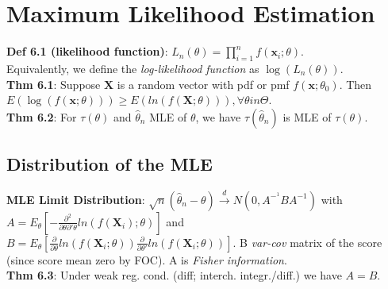 \section{Maximum Likelihood Estimation}
\textbf{Def 6.1 (likelihood function)}: $L_n(\theta) = \prod_{i=1}^nf(\textbf{x}_i;\theta)$.\\
Equivalently, we define the \textit{log-likelihood function} as $\log(L_n(\theta))$.\\
\textbf{Thm 6.1}: Suppose $\textbf{X}$ is a random vector with pdf or pmf $f(\textbf{x};\theta_0)$. Then $E(\log(f(\textbf{x};\theta)))\geq E(ln(f(\textbf{X};\theta))), \forall \theta in \Theta$.\\
\textbf{Thm 6.2}: For $\tau(\theta)$ and $\hat{\theta}_n$ MLE of $\theta$, we have $\tau(\hat{\theta}_n)$ is MLE of $\tau(\theta)$.

\subsection{Distribution of the MLE}
\textbf{MLE Limit Distribution}: $\sqrt{n}(\hat{\theta}_n - \theta) \xrightarrow{d} N(0, A^{-^1}BA^{-1})$ with $A = E_\theta[-\frac{\partial^2}{\partial\theta\partial'\theta}ln(f(\textbf{X}_i);\theta)]$ and $B = E_\theta[\frac{\partial}{\partial\theta}ln(f(\textbf{X}_i;\theta))\frac{\partial}{\partial\theta'}ln(f(\textbf{X}_i;\theta))]$. B \textit{var-cov} matrix of the score (since score mean zero by FOC). A is \textit{Fisher information}.\\
\textbf{Thm 6.3}: Under weak reg. cond. (diff; interch. integr./diff.) we have $A=B$.

